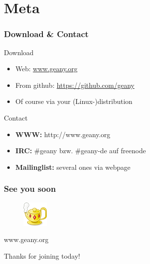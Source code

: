 \documentclass[compress]{beamer}
\begin{document}
	\section{Meta}
	\begin{frame}
		\frametitle{Download \& Contact}
		\begin{block}{Download}
			\begin{itemize}
				\item Web: \url{www.geany.org}
				\item From github: \url{https://github.com/geany}
				\item Of course via your (Linux-)distribution
			\end{itemize}
		\end{block}
		\begin{block}{Contact}
			\begin{itemize}
				\item \textbf{WWW:} http://www.geany.org
				\item \textbf{IRC:} \#geany bzw. \#geany-de auf freenode
				\item \textbf{Mailinglist:} several ones via webpage
			\end{itemize}
		\end{block}
	\end{frame}
	
	\begin{frame}[plain]
		\frametitle{See you soon}
		\begin{figure}[ht]
			\includegraphics{../../img/geany.png}
		\end{figure}
	
		\begin{center}
			\huge www.geany.org
		\end{center}
		\begin{center}
			\huge Thanks for joining today!
		\end{center}
	\end{frame}
\end{document}

